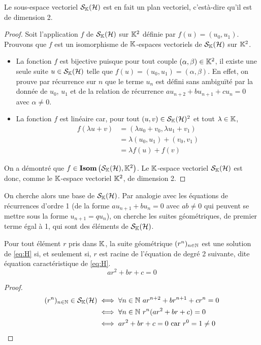 \begin{prop}
  Le sous-espace vectoriel $\mathcal{S}_{\mathbb{K}}(\mathcal{H})$ est en fait un plan vectoriel, c'està-dire qu'il est de dimension 2.
\end{prop}
\begin{proof}
  Soit l'application $f$ de $\mathcal{S}_{\mathbb{K}}(\mathcal{H})$ sur $\mathbb{K}^2$ définie par $f(u)=(u_0,u_1)$. Prouvons que $f$ est un isomorphisme de $\mathbb{K}$-espaces vectoriels de $\mathcal{S}_{\mathbb{K}}(\mathcal{H})$ sur $\mathbb{K}^2$.
  \begin{itemize}
  \item La fonction $f$ est bijective puisque pour tout couple $(\alpha, \beta) \in \mathbb{K}^2$, il existe une seule suite $u \in \mathcal{S}_{\mathbb{K}}(\mathcal{H})$ telle que $f(u)=(u_0,u_1)=(\alpha,\beta)$. En effet, on prouve par récurrence sur $n$ que le terme $u_n$ est défini sans ambiguïté par la donnée de $u_0$, $u_1$ et de la relation de récurrence $au_{n+2}+bu_{n+1}+cu_n=0$ avec $\alpha \neq 0$.
  \item La fonction $f$ est linéaire car, pour tout $(u,v) \in \mathcal{S}_{\mathbb{K}}(\mathcal{H})^2$ et tout $\lambda \in \mathbb{K}$,
    \begin{align}
      f(\lambda u+v) &=(\lambda u_0 +v_0, \lambda u_1+v_1) \\
      &=\lambda (u_0,u_1) +(v_0,v_1)\\
      &=\lambda f(u)+f(v)
    \end{align}
  \end{itemize}
On a démontré que $f \in \mathbf{Isom}\left(\mathcal{S}_{\mathbb{K}}(\mathcal{H}),\mathbb{K}^2\right)$. Le $\mathbb{K}$-espace vectoriel $\mathcal{S}_{\mathbb{K}}(\mathcal{H})$ est donc, comme le $\mathbb{K}$-espace vectoriel $\mathbb{K}^2$, de dimension 2.
\end{proof}

On cherche alors une base de $\mathcal{S}_{\mathbb{K}}(\mathcal{H})$. Par analogie avec les équations de récurrences d'ordre 1 (de la forme $au_{n+1}+bu_n =0$ avec $ab \neq 0$ qui peuvent se mettre sous la forme $u_{n+1}=qu_n$), on cherche les suites géométriques, de premier terme égal à 1, qui sont des éléments de $\mathcal{S}_{\mathbb{K}}(\mathcal{H})$.

\begin{prop}
  Pour tout élément $r$ pris dans $\mathbb{K}$, la suite géométrique $(r^n)_{n \in \mathbb{N}}$ est une solution de \eqref{eq:H} si, et seulement si, $r$ est racine de l'équation de degré 2 suivante, dite équation caractéristique de \eqref{eq:H}.
  \begin{equation}
    ar^2+br+c=0 \label{eq:EC} \tag{E.C.}
  \end{equation}
\end{prop}
\begin{proof}
  \begin{align}
    (r^n)_{n \in  \N} \in \S_\K(\H) &\iff \forall n \in \N \ ar^{n+2} +br^{n+1}+cr^n = 0 \\
    &\iff \forall n \in \N \ r^n(ar^2+br+c)=0\\
    &\iff ar^2+br+c=0 \text{~car } r^0=1 \neq 0
  \end{align}
\end{proof}


